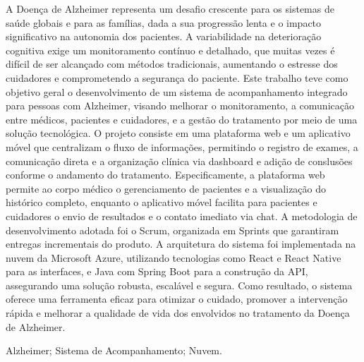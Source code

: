 \documentclass[conference,a4paper,10pt]{IEEETran}
\begin{document}
\begin{resumo}
A Doença de Alzheimer representa um desafio crescente para os sistemas de saúde globais e para as famílias, dada a sua progressão lenta e o impacto significativo na autonomia dos pacientes. A variabilidade na deterioração cognitiva exige um monitoramento contínuo e detalhado, que muitas vezes é difícil de ser alcançado com métodos tradicionais, aumentando o estresse dos cuidadores e comprometendo a segurança do paciente. Este trabalho teve como objetivo geral o desenvolvimento de um sistema de acompanhamento integrado para pessoas com Alzheimer, visando melhorar o monitoramento, a comunicação entre médicos, pacientes e cuidadores, e a gestão do tratamento por meio de uma solução tecnológica. O projeto consiste em uma plataforma web e um aplicativo móvel que centralizam o fluxo de informações, permitindo o registro de exames, a comunicação direta e a organização clínica via dashboard e adição de conslusões conforme o andamento do tratamento. Especificamente, a plataforma web permite ao corpo médico o gerenciamento de pacientes e a visualização do histórico completo, enquanto o aplicativo móvel facilita para pacientes e cuidadores o envio de resultados e o contato imediato via chat. A metodologia de desenvolvimento adotada foi o Scrum, organizada em Sprints que garantiram entregas incrementais do produto. A arquitetura do sistema foi implementada na nuvem da Microsoft Azure, utilizando tecnologias como React e React Native para as interfaces, e Java com Spring Boot para a construção da API, assegurando uma solução robusta, escalável e segura. Como resultado, o sistema oferece uma ferramenta eficaz para otimizar o cuidado, promover a intervenção rápida e melhorar a qualidade de vida dos envolvidos no tratamento da Doença de Alzheimer.
\end{resumo}

\begin{palavraschave}
Alzheimer; Sistema de Acompanhamento; Nuvem.
\end{palavraschave}
\end{document}

